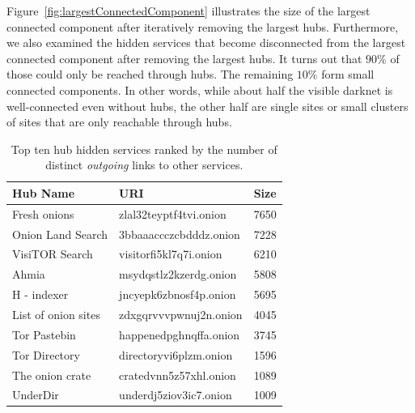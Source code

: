 Figure~\ref{fig:largestConnectedComponent} illustrates the size of the largest connected component after iteratively removing the largest hubs.
Furthermore, we also examined the hidden services that become disconnected from the largest connected component after removing the largest hubs. It turns out that $90\%$ of those could only be reached through hubs. The remaining $10\%$ form small connected components. In other words, while about half the visible darknet is well-connected even without hubs, the other half are single sites or small clusters of sites that are only reachable through hubs. 
\ifdgruyter
  \begin{table}[t]
      \begin{center}
          \caption{Top ten hub hidden services ranked by the number of distinct \emph{outgoing} links to other services.}
          \label{table:toptenout}
          \begin{tabular}{p{3cm} | p{3.5cm} | p{1cm}}
               \textbf{Hub Name} & \textbf{URI} & \textbf{Size} \\
               \hline
               \hline
              Fresh onions & zlal32teyptf4tvi.onion  &  7650\\
              \hline
              Onion Land Search & 3bbaaaccczcbdddz.onion  &  7228\\
              \hline
              VisiTOR Search & visitorfi5kl7q7i.onion  &  6210\\
              \hline
              Ahmia & msydqstlz2kzerdg.onion  &  5808\\
              \hline
              H - indexer & jncyepk6zbnosf4p.onion  &  5695\\
              \hline
              List of onion sites & zdxgqrvvvpwnuj2n.onion  &  4045\\
              \hline
              Tor Pastebin & happenedpghnqffa.onion  &  3745\\
              \hline
              Tor Directory & directoryvi6plzm.onion  &  1596\\
              \hline
              The onion crate & cratedvnn5z57xhl.onion  &  1089\\
              \hline
              UnderDir & underdj5ziov3ic7.onion  &  1009\\
          \end{tabular}
      \end{center}
  \end{table}
\fi

